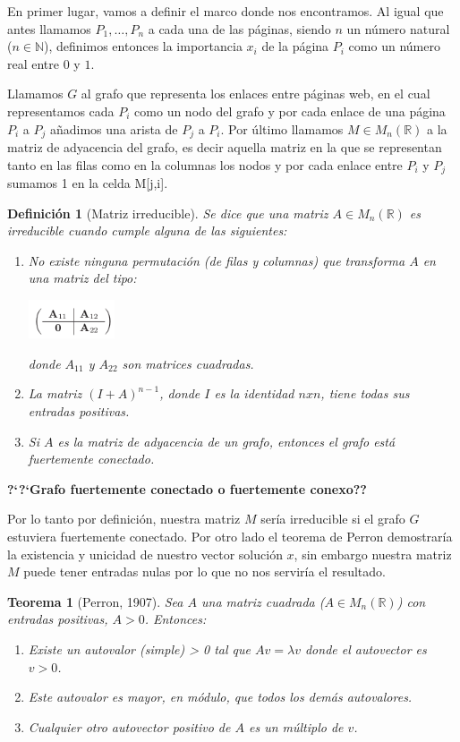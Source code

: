 \documentclass[size=a4, parskip=half, titlepage=false, toc=flat, toc=bib, 12pt]{scrartcl}
\theoremstyle{theorem-style}
\newtheorem{nth}{Teorema}[section]
\theoremstyle{definition-style}
\newtheorem{ndef}{Definición}[section]
\theoremstyle{remark-style}
\theoremstyle{example-style}
\theoremstyle{definition-style}
\theoremstyle{remark-style}
\begin{document}
En primer lugar, vamos a definir el marco donde nos encontramos. Al igual que antes llamamos $P_1, \dots, P_n$ a cada una de las páginas, siendo $n$ un número natural ($n \in \mathbb{N}$), definimos entonces la importancia $x_i$  de la página $P_i$ como un número real entre $0$ y $1$.

Llamamos $G$ al grafo que representa los enlaces entre páginas web, en el cual representamos cada $P_i$ como un nodo del grafo y por cada enlace de una página $P_i$ a $P_j$ añadimos una arista de $P_j$ a $P_i$. Por último llamamos $M \in  M_n(\mathbb{R})$ a la matriz de adyacencia del grafo, es decir aquella matriz en la que se representan tanto en las filas como en la columnas los nodos y por cada enlace entre $P_i$ y $P_j$ sumamos 1 en la celda M[j,i].

\begin{ndef}[Matriz irreducible]
Se dice que una matriz $A \in M_n(\mathbb{R})$ es irreducible cuando cumple alguna de las siguientes:
\begin{enumerate}
\item No existe ninguna permutación (de filas y columnas) que transforma $A$ en una matriz del tipo:
\begin{center}
\includegraphics[width=0.2\textwidth]{./img/mcuadrada}
\end{center}
donde $A_{11}$ y $A_{22}$ son matrices cuadradas.
\item La matriz $(I + A)^{n - 1}$, donde $I$ es la identidad $n x n$, tiene todas sus entradas positivas.
\item Si $A$ es la matriz de adyacencia de un grafo, entonces el grafo está fuertemente conectado.
\end{enumerate}
\end{ndef}

\textbf{?`?`Grafo fuertemente conectado o fuertemente conexo??}

Por lo tanto por definición, nuestra matriz $M$ sería irreducible si el grafo $G$ estuviera fuertemente conectado. Por otro lado el teorema de Perron demostraría la existencia y unicidad de nuestro vector solución $x$, sin embargo nuestra matriz $M$ puede tener entradas nulas por lo que no nos serviría el resultado.

\begin{nth}[Perron, 1907]
Sea $A$ una matriz cuadrada ($A \in M_n(\mathbb{R})$) con entradas positivas, $A > 0$. Entonces:
\begin{enumerate}
\item Existe un autovalor (simple) \lamda > 0 tal que $Av = \lambda v$ donde el autovector es $v > 0$.
\item Este autovalor es mayor, en módulo, que todos los demás autovalores.
\item Cualquier otro autovector positivo de $A$ es un múltiplo de $v$.
\end{enumerate}
\end{nth}
\end{document}
